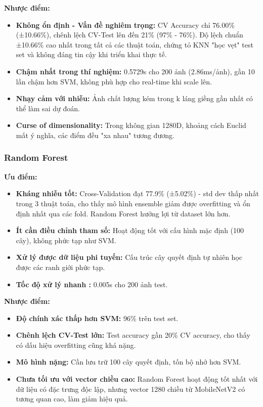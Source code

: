 \documentclass[a4paper]{book}
\begin{document}
\textbf{Nhược điểm:}
\begin{itemize}
    \item \textbf{Không ổn định - Vấn đề nghiêm trọng:} CV Accuracy chỉ 76.00\% (±10.66\%), chênh lệch CV-Test lên đến 21\% (97\% - 76\%). Độ lệch chuẩn ±10.66\% cao nhất trong tất cả các thuật toán, chứng tỏ KNN "học vẹt" test set và không đáng tin cậy khi triển khai thực tế.
    
    \item \textbf{Chậm nhất trong thí nghiệm:} 0.5729s cho 200 ảnh (2.86ms/ảnh), gần 10 lần chậm hơn SVM, không phù hợp cho real-time khi scale lên.
    
    \item \textbf{Nhạy cảm với nhiễu:} Ảnh chất lượng kém trong k láng giềng gần nhất có thể làm sai dự đoán.
    
    \item \textbf{Curse of dimensionality:} Trong không gian 1280D, khoảng cách Euclid mất ý nghĩa, các điểm đều "xa nhau" tương đương.
\end{itemize}

\subsubsection{Random Forest}

\textbf{Ưu điểm:}
\begin{itemize}
    \item \textbf{Kháng nhiễu tốt:} Cross-Validation đạt 77.9\% (±5.02\%) - std dev thấp nhất trong 3 thuật toán, cho thấy mô hình ensemble giảm được overfitting và ổn định nhất qua các fold. Random Forest hưởng lợi từ dataset lớn hơn.
    
    \item \textbf{Ít cần điều chỉnh tham số:} Hoạt động tốt với cấu hình mặc định (100 cây), không phức tạp như SVM.
    
    \item \textbf{Xử lý được dữ liệu phi tuyến:} Cấu trúc cây quyết định tự nhiên học được các ranh giới phức tạp.
    
    \item \textbf{Tốc độ xử lý nhanh :} 0.005s cho 200 ảnh test.
\end{itemize}

\textbf{Nhược điểm:}
\begin{itemize}
    \item \textbf{Độ chính xác thấp hơn SVM:} 96\% trên test set.
    
    \item \textbf{Chênh lệch CV-Test lớn:} Test accuracy gần  20\% CV accuracy, cho thấy có dấu hiệu overfitting cũng khá nặng.
    
    \item \textbf{Mô hình nặng:} Cần lưu trữ 100 cây quyết định, tốn bộ nhớ hơn SVM.
    
    \item \textbf{Chưa tối ưu với vector chiều cao:} Random Forest hoạt động tốt nhất với dữ liệu có đặc trưng độc lập, nhưng vector 1280 chiều từ MobileNetV2 có tương quan cao, làm giảm hiệu quả.
\end{itemize}
\end{document}
